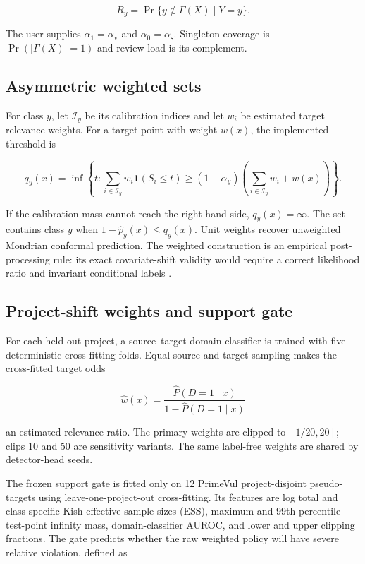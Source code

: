 \documentclass[preprint,12pt]{elsarticle}
\newcommand{\av}{\alpha_{\mathrm{v}}}
\newcommand{\as}{\alpha_{\mathrm{s}}}
\begin{document}
\begin{equation}
 R_y=\Pr\{y\notin\Gamma(X)\mid Y=y\}.
\end{equation}

The user supplies $\alpha_1=\av$ and $\alpha_0=\as$. Singleton coverage is $\Pr(|\Gamma(X)|=1)$ and review load is its complement.

\subsection{Asymmetric weighted sets}

For class $y$, let $\mathcal I_y$ be its calibration indices and let $w_i$ be estimated target relevance weights. For a target point with weight $w(x)$, the implemented threshold is

\begin{equation}
q_y(x)=\inf\left\{t:\sum_{i\in\mathcal I_y} w_i\mathbf 1(S_i\leq t)\geq(1-\alpha_y)\left(\sum_{i\in\mathcal I_y}w_i+w(x)\right)\right\}.
\label{eq:weighted}
\end{equation}

If the calibration mass cannot reach the right-hand side, $q_y(x)=\infty$. The set contains class $y$ when $1-\widehat p_y(x)\leq q_y(x)$. Unit weights recover unweighted Mondrian conformal prediction. The weighted construction is an empirical post-processing rule: its exact covariate-shift validity would require a correct likelihood ratio and invariant conditional labels \cite{tibshirani2019weightedcp}.

\subsection{Project-shift weights and support gate}

For each held-out project, a source--target domain classifier is trained with five deterministic cross-fitting folds. Equal source and target sampling makes the cross-fitted target odds

\begin{equation}
 \widehat w(x)=\frac{\widehat P(D=1\mid x)}{1-\widehat P(D=1\mid x)}
\end{equation}

an estimated relevance ratio. The primary weights are clipped to $[1/20,20]$; clips 10 and 50 are sensitivity variants. The same label-free weights are shared by detector-head seeds.

The frozen support gate is fitted only on 12 PrimeVul project-disjoint pseudo-targets using leave-one-project-out cross-fitting. Its features are log total and class-specific Kish effective sample sizes (ESS), maximum and 99th-percentile test-point infinity mass, domain-classifier AUROC, and lower and upper clipping fractions. The gate predicts whether the raw weighted policy will have severe relative violation, defined as
\end{document}
